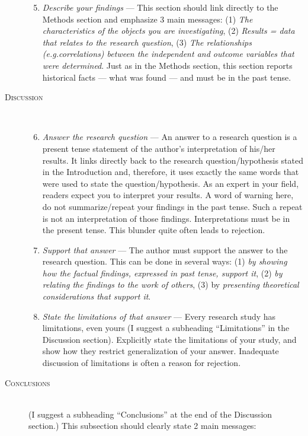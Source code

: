 \documentclass[graybox,envcountchap,sectrefs,UStrade]{svmono}
\begin{document}
\begin{description}
      \begin{enumerate}
      \setcounter{enumi}{4}
      \item \emph{Describe your findings} --- This section should link directly to the Methods section and emphasize 3 main messages: (1) \emph{The characteristics of the objects you are investigating}, (2) \emph{Results = data that relates to the research question}, (3) \emph{The relationships (e.g.\@ correlations) between the independent and outcome variables that were determined}. Just as in the Methods section, this section reports historical facts --- what was found --- and must be in the past tense.
      \end{enumerate}
\item[\textsc{Discussion}] \hfill \\
      \begin{enumerate}
      \setcounter{enumi}{5}
      \item \emph{Answer the research question} --- An answer to a research question is a present tense statement of the author's interpretation of his/her results. It links directly back to the research question/hypothesis stated in the Introduction and, therefore, it uses exactly the same words that were used to state the question/hypothesis. As an expert in your field, readers expect you to interpret your results. A word of warning here, do not summarize/repeat your findings in the past tense. Such a repeat is not an interpretation of those findings. Interpretations must be in the present tense. This blunder quite often leads to rejection.
      \item \emph{Support that answer} --- The author must support the answer to the research question. This can be done in several ways: (1) \emph{by showing how the factual findings, expressed in past tense, support it}, (2) \emph{by relating the findings to the work of others}, (3) by \emph{presenting theoretical considerations that support it}.
      \item \emph{State the limitations of that answer} --- Every research study has limitations, even yours (I suggest a subheading ``Limitations'' in the Discussion section). Explicitly state the limitations of your study, and show how they restrict generalization of your answer. Inadequate discussion of limitations is often a reason for rejection.
      \end{enumerate}
\item[\textsc{Conclusions}] \hfill \\
 (I suggest a subheading ``Conclusions'' at the end of the Discussion section.) This subsection should clearly state 2 main messages:

\end{description}
\end{document}
